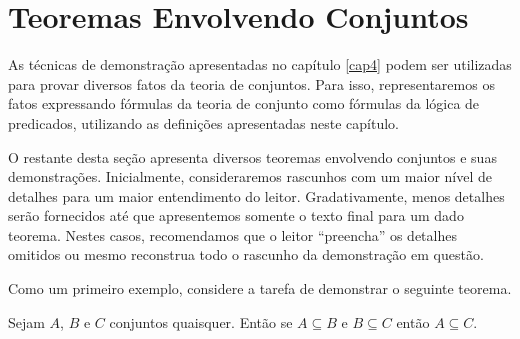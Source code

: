 \section{Teoremas Envolvendo Conjuntos}

As técnicas de demonstração apresentadas no capítulo \ref{cap4} podem
ser utilizadas para provar diversos fatos da teoria de conjuntos. Para
isso, representaremos os fatos expressando fórmulas da teoria de
conjunto como fórmulas da lógica de predicados, utilizando as definições
apresentadas neste capítulo.

O restante desta seção apresenta diversos teoremas envolvendo
conjuntos e suas demonstrações. Inicialmente, consideraremos rascunhos
com um maior nível de detalhes para um maior entendimento do
leitor. Gradativamente, menos detalhes serão fornecidos até que
apresentemos somente o texto final para um dado teorema. Nestes casos,
recomendamos que o leitor ``preencha'' os detalhes omitidos ou mesmo
reconstrua todo o rascunho da demonstração em questão.

\begin{Example}
Como um primeiro exemplo, considere a tarefa de demonstrar o seguinte
teorema.
\begin{center}
Sejam $A$, $B$ e $C$ conjuntos quaisquer. Então se $A\subseteq B$ e
$B\subseteq C$ então $A\subseteq C$.
\end{center}
\end{Example}